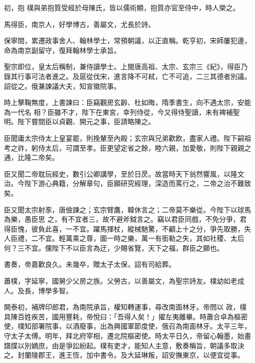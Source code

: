 \begin{pinyinscope}
 初，抱
 樸與弟抱質受經於母陳氏，皆以儒術顯，抱質亦官至侍中，時人榮之。



 馬得臣，南京人，好學博古，善屬文，尤長於詩。



 保寧間，累遷政事舍人、翰林學士，常預朝議，以正直稱。乾亨初，宋師屢犯邊，命為南京副留守，復拜翰林學士承旨。



 聖宗即位，皇太后稱制，兼侍讀學士。上閱唐高祖、太宗、玄宗三《紀》，得臣乃錄其行事可法者進之。及扈從伐宋，進言降不可弒，亡不可追，二三其德者別議。詔從之。俄兼諫議大夫，知宣徽院事。



 時上擊鞠無度，上書諫曰：臣竊觀房玄齡、杜如晦，隋季書生，向不遇太宗，安能為一代名
 相？臣雖不才，陛下在東宮，幸列侍從，今又得侍聖讀，未有裨補聖明。陛下嘗間臣以貞觀、開元之事，臣請略陳之。



 臣聞庸太宗侍太上皇宴罷，則挽輦至內殿；玄宗與兄弟歡飲，盡家人禮。陛下嗣祖考之祚，躬侍太后，可謂至孝。臣更望定省之餘，睦六親，加愛敬，則陛下親親之通，比隆二帝矣。



 臣又聞二帝耽玩經史，數引公卿講學，至於日昃。故當時天下翁然響風，以隆文治。今陛下游心典籍，分解章句，臣願研究經理，深造而罵行之，二帝之治不難致矣。



 臣又聞太宗射豕，唐儉諫之；玄宗臂鷹，韓休言之；二帝莫不樂從。今陛下以球馬為樂，愚臣思
 之，有不宜者三，故不避斧鉞言之。竊以君臣同戲，不免分爭，君得臣愧，彼負此喜，一不宜。躍馬揮杖，縱械馳驚，不顧上十之分，爭先取勝，失人臣禮，二不宜。輕萬乘之尊，圖一時之樂，萬一有銜勒之失，其如社稷、太后何？三不宜。儻陛下不以臣言為迂，少賜省覽，天下之福，群臣之願也。



 書奏，帝嘉歡良久。未幾卒，贈太子太保，詔有司給葬。



 蕭樸，字延寧，國舅少父房之族。父勞古，以善屬文，為聖宗詩友。樸幼如老成人。及長，博學多智。



 開泰初，補牌印郎君，為南院承旨，權知轉運事，尋改南面林牙。帝問以
 政，樸具陳百姓疾苦，國用豐耗，帝悅曰：「吾得人矣！」擢左夷離畢。時蕭合卓為樞密使，樸知部署院事，以酒廢事，出為興國軍節度使，俄召為南面林牙。太平三年，守太子太傅。明年，拜北府宰相，遷北院樞密使。時太平日久，帝留心翰墨，始畫譜牒以別嫡庶，由是爭訟紛起。樸有吏才，能知人主意，敷奏稱旨，朝議多取決之。封蘭陵郡王，進王恆，加中書令。及大延琳叛，詔安撫東京，以便宜從事。




\end{pinyinscope}
